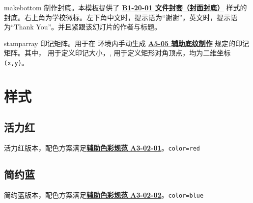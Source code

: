\documentclass[a4paper,12pt]{article}
\begin{document}
\begin{docCommand*}[]{makebottom}{}
    制作封底。本模板提供了 \href{https://vi.sjtu.edu.cn/index.php/articles/app/7}{\textbf{B1-20-01 文件封套（封面封底）}} 样式的封底。右上角为学校徽标。左下角中文时，提示语为“谢谢”，英文时，提示语为``Thank You''。并且紧跟该幻灯片的作者与标题。
\end{docCommand*}

\begin{docCommand*}[]{stamparray}{}
    印记矩阵。用于在  环境内手动生成 \href{http://vi.sjtu.edu.cn/index.php/articles/base/5}{\textbf{A5-05 辅助底纹制作}} 规定的印记矩阵。其中， 用于定义印记大小，, 用于定义矩形对角顶点，均为二维坐标 \verb"(x,y)"。 
\end{docCommand*}

\newpage
\section{样式}

\subsection{活力红}

活力红版本，配色方案满足\href{http://vi.sjtu.edu.cn/index.php/articles/base/3}{\textbf{辅助色彩规范 A3-02-01}}。\hfill\texttt{color=red}

\begin{tcbraster}[raster columns=3,colframe=red,colback=white,
    colbacktitle=red!50!white,fonttitle=\small\bfseries\ttfamily,
    left=0pt,right=0pt,top=0pt,bottom=0pt,boxsep=0pt,boxrule=0.6pt,
    toptitle=1mm,bottomtitle=1mm,drop lifted shadow,center title,
    graphics pages={1,...,12}]
\end{tcbraster}

\clearpage
\subsection{简约蓝}

简约蓝版本，配色方案满足\href{http://vi.sjtu.edu.cn/index.php/articles/base/3}{\textbf{辅助色彩规范 A3-02-02}}。\hfill \texttt{color=blue}

\begin{tcbraster}[raster columns=3,colframe=blue,colback=white,
    colbacktitle=blue!50!white,fonttitle=\small\bfseries\ttfamily,
    left=0pt,right=0pt,top=0pt,bottom=0pt,boxsep=0pt,boxrule=0.6pt,
    toptitle=1mm,bottomtitle=1mm,drop lifted shadow,center title,
    graphics pages={1,...,12}]
\end{tcbraster}
\end{document}
